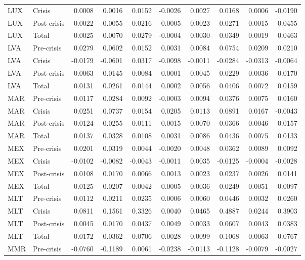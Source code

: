 \begin{longtable}[t]{llrrrrrrrr}
LUX & Crisis & 0.0008 & 0.0016 & 0.0152 & -0.0026 & 0.0027 & 0.0168 & 0.0006 & -0.0190\\
LUX & Post-crisis & 0.0022 & 0.0055 & 0.0216 & -0.0005 & 0.0023 & 0.0271 & 0.0015 & 0.0455\\
LUX & Total & 0.0025 & 0.0070 & 0.0279 & -0.0004 & 0.0030 & 0.0349 & 0.0019 & 0.0463\\
\addlinespace
LVA & Pre-crisis & 0.0279 & 0.0602 & 0.0152 & 0.0031 & 0.0084 & 0.0754 & 0.0209 & 0.0210\\
LVA & Crisis & -0.0179 & -0.0601 & 0.0317 & -0.0098 & -0.0011 & -0.0284 & -0.0313 & -0.0064\\
LVA & Post-crisis & 0.0063 & 0.0145 & 0.0084 & 0.0001 & 0.0045 & 0.0229 & 0.0036 & 0.0170\\
LVA & Total & 0.0131 & 0.0261 & 0.0144 & 0.0002 & 0.0056 & 0.0406 & 0.0072 & 0.0159\\
MAR & Pre-crisis & 0.0117 & 0.0284 & 0.0092 & -0.0003 & 0.0094 & 0.0376 & 0.0075 & 0.0160\\
\addlinespace
MAR & Crisis & 0.0251 & 0.0737 & 0.0154 & 0.0205 & 0.0113 & 0.0891 & 0.0167 & -0.0043\\
MAR & Post-crisis & 0.0124 & 0.0255 & 0.0111 & 0.0015 & 0.0070 & 0.0366 & 0.0046 & 0.0157\\
MAR & Total & 0.0137 & 0.0328 & 0.0108 & 0.0031 & 0.0086 & 0.0436 & 0.0075 & 0.0133\\
MEX & Pre-crisis & 0.0201 & 0.0319 & 0.0044 & -0.0020 & 0.0048 & 0.0362 & 0.0089 & 0.0092\\
MEX & Crisis & -0.0102 & -0.0082 & -0.0043 & -0.0011 & 0.0035 & -0.0125 & -0.0004 & -0.0028\\
\addlinespace
MEX & Post-crisis & 0.0108 & 0.0170 & 0.0066 & 0.0013 & 0.0023 & 0.0237 & 0.0026 & 0.0141\\
MEX & Total & 0.0125 & 0.0207 & 0.0042 & -0.0005 & 0.0036 & 0.0249 & 0.0051 & 0.0097\\
MLT & Pre-crisis & 0.0112 & 0.0211 & 0.0235 & 0.0006 & 0.0060 & 0.0446 & 0.0032 & 0.0260\\
MLT & Crisis & 0.0811 & 0.1561 & 0.3326 & 0.0040 & 0.0465 & 0.4887 & 0.0244 & 0.3903\\
MLT & Post-crisis & 0.0045 & 0.0170 & 0.0437 & 0.0049 & 0.0033 & 0.0607 & 0.0043 & 0.0383\\
\addlinespace
MLT & Total & 0.0172 & 0.0362 & 0.0706 & 0.0028 & 0.0099 & 0.1068 & 0.0063 & 0.0767\\
MMR & Pre-crisis & -0.0760 & -0.1189 & 0.0061 & -0.0238 & -0.0113 & -0.1128 & -0.0079 & -0.0027\\

\end{longtable}
